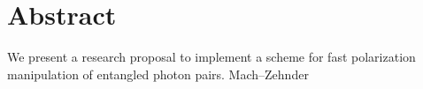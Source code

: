 \chapter*{Abstract}

We present a research proposal to implement a scheme for fast polarization manipulation of entangled photon pairs.
	Mach–Zehnder
\cite{Fognini18} 

